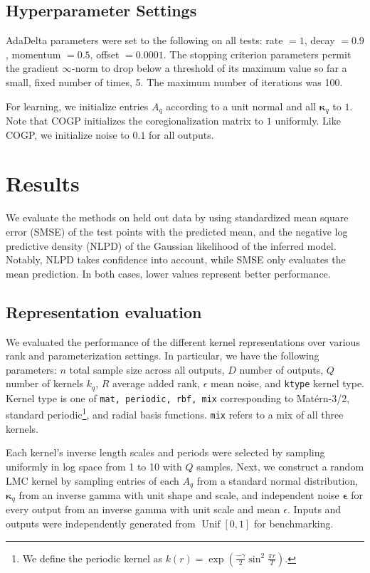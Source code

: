 \documentclass{article}
\def\bse{{\boldsymbol\epsilon}}
\def\bsk{{\boldsymbol\kappa}}
\DeclareMathOperator\Unif{Unif}
\begin{document}
\subsection{Hyperparameter Settings}

AdaDelta parameters were set to the following on all tests: rate $=1$, decay $=0.9$, momentum $=0.5$, offset $=0.0001$. The stopping criterion parameters permit the gradient $\infty$-norm to drop below a threshold of its maximum value so far a small, fixed number of times, 5. The maximum number of iterations was 100.

For learning, we initialize entries $A_q$ according to a unit normal and all $\bsk_q$ to $1$. Note that COGP initializes the coregionalization matrix to $1$ uniformly. Like COGP, we initialize noise to $0.1$ for all outputs.

\section{Results} %
\label{sec:results}
We evaluate the methods on held out data by using standardized mean square error (SMSE) of the test points with the predicted mean, and the negative log predictive density (NLPD) of the Gaussian likelihood of the inferred model. Notably, NLPD takes confidence into account, while SMSE only evaluates the mean prediction. In both cases, lower values represent better performance. 

\subsection{Representation evaluation}\label{empirical-rep}

We evaluated the performance of the different kernel representations over various rank and parameterization settings. In particular, we have the following parameters: $n$ total sample size across all outputs, $D$ number of outputs, $Q$ number of kernels $k_q$, $R$ average added rank, $\epsilon$ mean noise, and \texttt{ktype} kernel type. Kernel type is one of \texttt{mat, periodic, rbf, mix} corresponding to Mat\'{e}rn-3/2, standard periodic\footnote{We define the periodic kernel as $k(r) = \exp \left(\frac{-\gamma}{2}\sin^2\frac{\pi r}{T}\right)$.}, and radial basis functions. \texttt{mix} refers to a mix of all three kernels.

Each kernel's inverse length scales and periods were selected by sampling uniformly in log space from 1 to 10 with $Q$ samples. Next, we construct a random LMC kernel by sampling entries of each $A_q$ from a standard normal distribution, $\bsk_q$ from an inverse gamma with unit shape and scale, and independent noise $\bse$ for every output from an inverse gamma with unit scale and mean $\epsilon$. Inputs and outputs were independently generated from $\Unif[0,1]$ for benchmarking.
\end{document}
